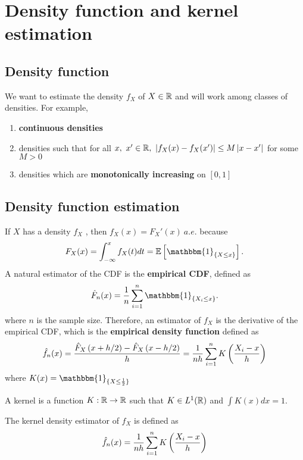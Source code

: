 \section{Density function and kernel estimation}
\subsection{Density function}
We want to estimate the density $f_X$ of $X\in \mathbb{R}$ and will work among classes of densities. For example,
\begin{enumerate}
    \item \textbf{continuous densities}
    \item densities such that for all $x,\ x'\in \mathbb{R},\ \left| f_X(x)-f_X(x')\right|\le M\left| x-x'\right|$ for some $M>0$
    \item densities which are \textbf{monotonically increasing} on $[0,1]$
\end{enumerate}

\subsection{Density function estimation}
If $X$ has a density $f_X$ , then $f_X(x)=F_X'(x)\ a.e.$ because \begin{equation*}
    F_X(x)=\int_{-\infty}^x f_X(t)dt=\E\bra{\mathbbm{1}_{\{X\le x\}}}.
\end{equation*}
A natural estimator of the CDF is the  \textbf{empirical CDF}, defined as
\begin{equation*}
    \hat{F}_n(x)=\frac{1}{n}\sum_{i=1}^n \mathbbm{1}_{\{X_i\le x\}}.
\end{equation*} where $n$ is the sample size. Therefore, an estimator of $f_X$ is the derivative of the empirical CDF, which is the \textbf{empirical density function} defined as \begin{equation*}
    \begin{split}
        \hat{f}_n(x)=\frac{\hat{F}_X\left(x+h/2\right)-\hat{F}_X\left(x-h/2\right)}{h}= \frac{1}{nh}\sum_{i=1}^n K\left(\frac{X_i-x}{h}\right)
    \end{split}
\end{equation*} where $K(x)=\mathbbm{1}_{\{X\le \frac{1}{2}\}}$
\begin{definition}
    A kernel is a function $K:\mathbb{R}\to \mathbb{R}$ such that $K\in L^1(\mathbb{R})$ and $\int K(x)dx=1$.
\end{definition}
\begin{definition}
The kernel density estimator of $f_X$ is defined as \begin{equation*}
    \hat{f}_n(x)=\frac{1}{nh}\sum_{i=1}^n K\left(\frac{X_i-x}{h}\right)
\end{equation*}
\end{definition}
